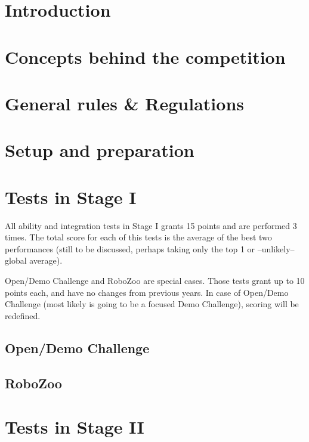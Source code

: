 \documentclass[a4paper]{article}
\begin{document}
\section{Introduction}
\section{Concepts behind the competition}
\section{General rules \& Regulations}
\section{Setup and preparation}

\section{Tests in Stage I}

\begin{itshape}
All ability and integration tests in Stage I grants 15 points and are performed 3 times. The total score for each of this tests is the average of the best two performances (still to be discussed, perhaps taking only the top 1 or --unlikely-- global average).

Open/Demo Challenge and RoboZoo are special cases. Those tests grant up to 10 points each, and have no changes from previous years. In case of Open/Demo Challenge (most likely is going to be a focused Demo Challenge), scoring will be redefined.
\end{itshape}







\subsection{Open/Demo Challenge}



\subsection{RoboZoo}



\section{Tests in Stage II}
\end{document}
